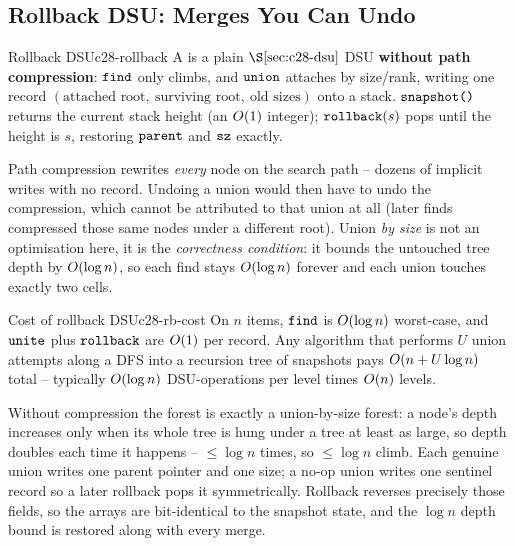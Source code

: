 \subsection{Rollback DSU: Merges You Can Undo}

\begin{definition}{Rollback DSU}{c28-rollback}
A  is a plain \(\secref{c28-dsu}\) DSU
\textbf{without path compression}: \(\texttt{find}\) only climbs, and
\(\texttt{union}\) attaches by size/rank, writing one record
\((\text{attached root},\ \text{surviving root},\ \text{old sizes})\) onto a
stack.  \(\texttt{snapshot()}\) returns the current stack height (an
\(O(1)\) integer); \(\texttt{rollback}(s)\) pops until the height is \(s\),
restoring \(\texttt{parent}\) and \(\texttt{sz}\) exactly.
\end{definition}

\begin{warningbox}
Path compression rewrites \emph{every} node on the search path -- dozens of
implicit writes with no record.  Undoing a union would then have to undo the
compression, which cannot be attributed to that union at all (later finds
compressed those same nodes under a different root).  Union \emph{by size}
is not an optimisation here, it is the \emph{correctness condition}: it
bounds the untouched tree depth by \(O(\log n)\), so each find stays
\(O(\log n)\) forever and each union touches exactly two cells.
\end{warningbox}

\begin{proposition}{Cost of rollback DSU}{c28-rb-cost}
On \(n\) items, \(\texttt{find}\) is \(O(\log n)\) worst-case, and
\(\texttt{unite}\) plus \(\texttt{rollback}\) are \(O(1)\) per record.  Any
algorithm that performs \(U\) union attempts along a DFS into a recursion
tree of snapshots pays \(O(n + U\log n)\) total -- typically
\(O(\log n)\) DSU-operations per level times \(O(n)\) levels.
\end{proposition}
\begin{proofbox}
Without compression the forest is exactly a union-by-size forest: a node's
depth increases only when its whole tree is hung under a tree at least as
large, so depth doubles each time it happens -- \(\le\log n\) times, so
\(\le\log n\) climb.  Each genuine union writes one parent pointer and one
size; a no-op union writes one sentinel record so a later rollback pops it
symmetrically.  Rollback reverses precisely those fields, so the arrays are
bit-identical to the snapshot state, and the \(\log n\) depth bound is
restored along with every merge.
\end{proofbox}

